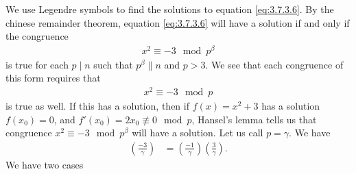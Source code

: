 \documentclass[12 pt]{amsart}
\begin{document}
  We use Legendre symbols to find the solutions to 
  equation \ref{eq:3.7.3.6}.
  By the chinese remainder theorem, 
  equation \ref{eq:3.7.3.6} will 
  have a solution if and only if the congruence
  \begin{align*}
    x^2 \equiv -3 \mod p^{\beta} 
  \end{align*}
  is true for each $p \mid n$ such that 
  $p^{\beta} \parallel n$ and $p > 3$.
  We see that each congruence of this form requires that 
  \begin{align*}
    x^2 \equiv -3 \mod p
  \end{align*}
  is true as well.
  If this has a solution, then if $f(x) = x^2 + 3$ has a solution
  $f(x_0) = 0$, and $f'(x_0) = 2x_0 \not \equiv 0 \mod p$, Hansel's
  lemma tells us that congruence $x^2 \equiv -3 \mod p^{\beta}$
  will have a solution.
  Let us call $p = \gamma$.
  We have 
  \begin{align*}
    \left( \frac{-3}{\gamma} \right)
    &=
      \left( \frac{-1}{\gamma} \right)
      \left( \frac{3}{\gamma} \right).
  \end{align*}
  We have two cases
\end{document}
